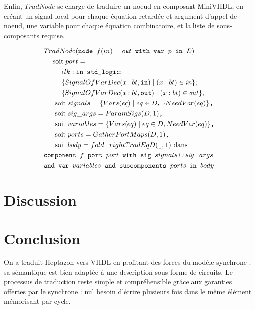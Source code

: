 \documentclass[a4paper]{article}
\newcommand{\LANG}{Heptagon}
\newcommand{\p}[0]{\; \vert \;}
\newcommand{\mybox}[1]{\mbox{\tt{#1}}}
\newcommand{\bl}[0]{\hspace{0.45cm}}
\begin{document}
Enfin, $TradNode$ se charge de traduire un noeud en composant MiniVHDL, en
cr\'eant un signal local pour chaque \'equation retard\'ee et argument d'appel de
noeud, une variable pour chaque \'equation combinatoire, et la liste de
sous-composants requise.

\begin{align*}
  & TradNode(\mybox{node } f(in) = out \mybox{ with var } p \mybox{ in } D) = \\
  & \bl \mbox{soit } port = \\
  & \bl \bl clk : \mybox{in std\_logic}; \\
  & \bl \bl \{ SignalOfVarDec(x : bt, \mybox{in}) \p (x : bt) \in in \}; \\
  & \bl \bl \{ SignalOfVarDec(x : bt, \mybox{out}) \p (x : bt) \in out \}, \\
  & \bl \mbox{ soit } signals = \{ \V{eq} \p eq \in D, \neg \NV{eq} \}
  \mybox{,} \\
  & \bl \mbox{ soit } sig\_args = \PS{D}{1} \mybox{,} \\
  & \bl \mbox{ soit } variables = \{ \V{eq} \p eq \in D, \NV{eq} \} \mybox{,} \\
  & \bl \mbox{ soit } ports = \GPM{D}{1} \mybox{,} \\
  & \bl \mbox{ soit } body = fold\_right TradEq D ([], 1) \mbox{ dans} \\
  & \mybox{component } f \mybox{ port } port \mybox{ with sig } signals \cup
  sig\_args \\
  & \mybox{and var } variables \mybox{ and subcomponents } ports \mybox{ in }
  body
\end{align*}

\section{Discussion}

\section{Conclusion}

On a traduit \LANG{} vers VHDL en profitant des forces du mod\`ele synchrone : sa
s\'emantique est bien adapt\'ee \`a une description sous forme de circuits. Le
processus de traduction reste simple et compr\'ehensible gr\^ace aux garanties
offertes par le synchrone : nul besoin d'\'ecrire plusieurs fois dans le m\^eme
\'el\'ement m\'emorisant par cycle.

\tableofcontents
\end{document}
